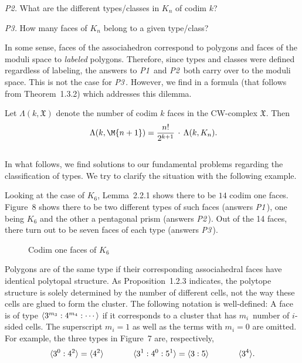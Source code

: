 \documentclass[10pt]{amsart}
\begin{document}
{\em P2.}     What are the different types/classes in $K_n$ of codim $k$? 
\vspace{.03in}

{\em P3.}    How many faces of $K_n$ belong to a given type/class?
\vspace{.1in}

In some sense, faces of the associahedron correspond to polygons and faces of the moduli space to {\em labeled} polygons.  Therefore, since types and classes were defined regardless of labeling, the answers to {\em P1}\, and {\em P2}\, both carry over to the moduli space. This is not the case for {\em P3}\,. However, we find in \cite{dev} a formula (that follows from Theorem~1.3.2) which addresses this dilemma.

\begin{prop} 
Let $\Lambda(k, {\mathfrak X})$ denote the number of codim $k$ faces in the CW-complex ${\mathfrak X}$. Then
$$\ \Lambda(k, \M{n+1})    =   {\displaystyle \frac{n!}{2^{k+1}}} \, \cdot \, \Lambda(k, K_n).$$
\label{p:k-to-m}
\end{prop}


\subsection{}
In what follows, we find solutions to our fundamental problems regarding the classification of types. We try to clarify the situation with the following example.

\begin{exmp}
Looking at the case of $K_6$, Lemma~2.2.1 shows there to be $14$ codim one faces.  Figure~8 shows there to be two different types of such faces (answers {\em P1}\,), one being $K_6$ and the other a pentagonal prism (answers {\em P2}\,).  Out of the 14 faces, there turn out to be seven faces of each type (answers {\em P3}\,). 
\end{exmp}

\begin{figure} [h]
\caption{Codim one faces of $K_6$}
\label{k6codim1}
\end{figure}

Polygons are of the same type if their corresponding associahedral faces have identical polytopal structure. As Proposition~1.2.3 indicates, the polytope structure is solely determined by the number of different cells, not the way these cells are glued to form the cluster. The following notation is well-defined:  A face is of type ${\langle} 3^{m_3} : 4^{m_4} : \cdots {\rangle}$ if it corresponds to a cluster that has $m_i$~number of $i$-sided cells.  The superscript $m_i = 1$ as well as the terms with $m_i = 0$ are omitted. For example, the three types in Figure~7 are, respectively, $${\langle} 3^0 : 4^2 {\rangle} = {\langle} 4^2 {\rangle} \hspace{.5in} {\langle} 3^1 : 4^0 : 5^1 {\rangle} = {\langle} 3 : 5 {\rangle} \hspace{.5in} {\langle} 3^4 {\rangle}.$$
\end{document}
